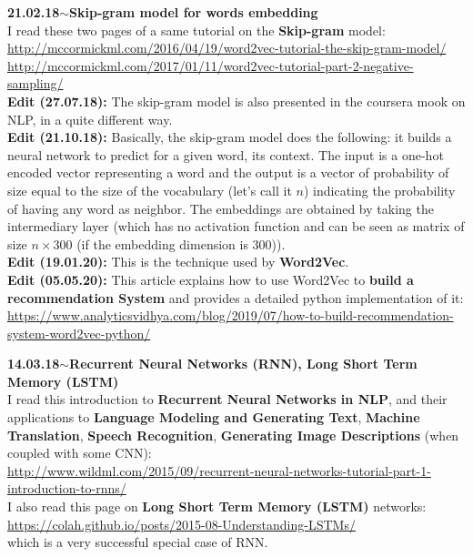 \documentclass[11pt,a4paper]{article}
\newenvironment{loggentry}[2]%
{\noindent\textbf{#1}\hspace{1cm}$\mathbf{\sim}$\text{ }\textbf{#2}\\}{\vspace{0.5cm}}
\begin{document}
\begin{loggentry}{21.02.18}{Skip-gram model for words embedding}
I read these two pages of a same tutorial on the \textbf{Skip-gram} model:\\
\url{http://mccormickml.com/2016/04/19/word2vec-tutorial-the-skip-gram-model/}\\
\url{http://mccormickml.com/2017/01/11/word2vec-tutorial-part-2-negative-sampling/}\\
\textbf{Edit (27.07.18):} The skip-gram model is also presented in the coursera mook on NLP, in a quite different way.\\
\textbf{Edit (21.10.18):} Basically, the skip-gram model does the following: it builds a neural network to predict for a given word, its context. The input is a one-hot encoded vector representing a word and the output is a vector of probability of size equal to the size of the vocabulary (let's call it $n$) indicating the probability of having any word as neighbor. The embeddings are obtained by taking the intermediary layer (which has no activation function and can be seen as matrix of size $n\times 300$ (if the embedding dimension is $300$)).\\
\textbf{Edit (19.01.20):} This is the technique used by \textbf{Word2Vec}.\\
\textbf{Edit (05.05.20):} This article explains how to use Word2Vec to \textbf{build a recommendation System} and provides a detailed python implementation of it:\\
\url{https://www.analyticsvidhya.com/blog/2019/07/how-to-build-recommendation-system-word2vec-python/}
\end{loggentry}

\begin{loggentry}{14.03.18}{Recurrent Neural Networks (RNN), Long Short Term Memory (LSTM)}
I read this introduction to \textbf{Recurrent Neural Networks in NLP}, and their applications to \textbf{Language Modeling and Generating Text}, \textbf{Machine Translation}, \textbf{Speech Recognition}, \textbf{Generating Image Descriptions} (when coupled with some CNN):\\
\url{http://www.wildml.com/2015/09/recurrent-neural-networks-tutorial-part-1-introduction-to-rnns/}\\
I also read this page on \textbf{Long Short Term Memory (LSTM)} networks:\\
\url{https://colah.github.io/posts/2015-08-Understanding-LSTMs/}\\
which is a very successful special case of RNN.
\end{loggentry}
\end{document}
